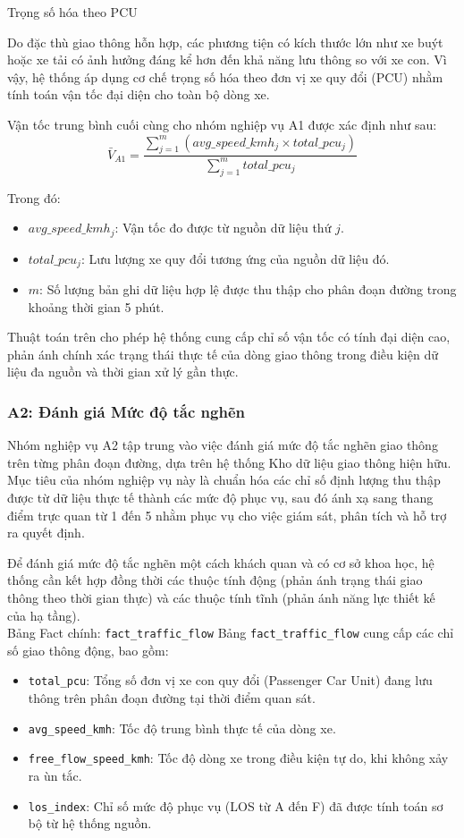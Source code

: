 Trọng số hóa theo PCU

Do đặc thù giao thông hỗn hợp, các phương tiện có kích thước lớn như xe buýt hoặc xe tải có ảnh hưởng đáng kể hơn đến khả năng lưu thông so với xe con. Vì vậy, hệ thống áp dụng cơ chế trọng số hóa theo đơn vị xe quy đổi (PCU) nhằm tính toán vận tốc đại diện cho toàn bộ dòng xe.

Vận tốc trung bình cuối cùng cho nhóm nghiệp vụ A1 được xác định như sau:
\[
\bar{V}_{A1} = \frac{\sum_{j=1}^{m} \left( avg\_speed\_kmh_j \times total\_pcu_j \right)}{\sum_{j=1}^{m} total\_pcu_j}
\]

Trong đó:
\begin{itemize}
    \item $avg\_speed\_kmh_j$: Vận tốc đo được từ nguồn dữ liệu thứ $j$.
    \item $total\_pcu_j$: Lưu lượng xe quy đổi tương ứng của nguồn dữ liệu đó.
    \item $m$: Số lượng bản ghi dữ liệu hợp lệ được thu thập cho phân đoạn đường trong khoảng thời gian 5 phút.
\end{itemize}

Thuật toán trên cho phép hệ thống cung cấp chỉ số vận tốc có tính đại diện cao, phản ánh chính xác trạng thái thực tế của dòng giao thông trong điều kiện dữ liệu đa nguồn và thời gian xử lý gần thực.

\subsubsection{A2: Đánh giá Mức độ tắc nghẽn}

Nhóm nghiệp vụ A2 tập trung vào việc đánh giá mức độ tắc nghẽn giao thông trên từng phân đoạn đường, dựa trên hệ thống Kho dữ liệu giao thông hiện hữu. Mục tiêu của nhóm nghiệp vụ này là chuẩn hóa các chỉ số định lượng thu thập được từ dữ liệu thực tế thành các mức độ phục vụ, sau đó ánh xạ sang thang điểm trực quan từ 1 đến 5 nhằm phục vụ cho việc giám sát, phân tích và hỗ trợ ra quyết định.


Để đánh giá mức độ tắc nghẽn một cách khách quan và có cơ sở khoa học, hệ thống cần kết hợp đồng thời các thuộc tính động (phản ánh trạng thái giao thông theo thời gian thực) và các thuộc tính tĩnh (phản ánh năng lực thiết kế của hạ tầng).\\

Bảng Fact chính: \texttt{fact\_traffic\_flow}
Bảng \texttt{fact\_traffic\_flow} cung cấp các chỉ số giao thông động, bao gồm:
\begin{itemize}
    \item \texttt{total\_pcu}: Tổng số đơn vị xe con quy đổi (Passenger Car Unit) đang lưu thông trên phân đoạn đường tại thời điểm quan sát.
    \item \texttt{avg\_speed\_kmh}: Tốc độ trung bình thực tế của dòng xe.
    \item \texttt{free\_flow\_speed\_kmh}: Tốc độ dòng xe trong điều kiện tự do, khi không xảy ra ùn tắc.
    \item \texttt{los\_index}: Chỉ số mức độ phục vụ (LOS từ A đến F) đã được tính toán sơ bộ từ hệ thống nguồn.
\end{itemize}


